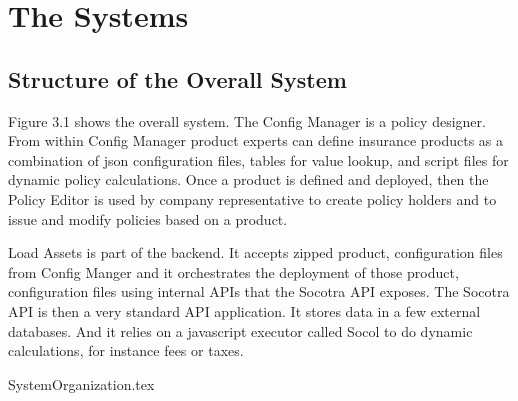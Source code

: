 \chapter{The Systems}
\label{intro04} %


\section{Structure of the Overall System}
\label{sec:03:1}

Figure 3.1 shows the overall system. The Config Manager is a policy designer. From within Config
Manager product experts can define insurance products as a combination of json configuration
files, tables for value lookup, and script files for dynamic policy calculations. Once a product
is defined and deployed, then the Policy Editor is used by company representative to create
policy holders and to issue and modify policies based on a product.

Load Assets is part of the backend. It accepts zipped product, configuration files from Config Manger and
it orchestrates the deployment of those product, configuration files using internal APIs that the
Socotra API exposes. The Socotra API is then a very standard API application. It stores data in
a few external databases. And it relies on a javascript executor called Socol to do dynamic calculations,
for instance fees or taxes.

{SystemOrganization.tex}

